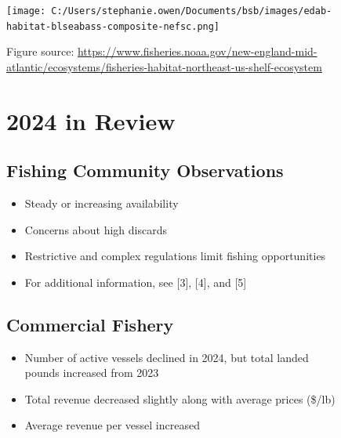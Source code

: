 \documentclass[
  10pt,
  letterpaper,
  DIV=11,
  numbers=noendperiod]{scrartcl}
\providecommand{\tightlist}{%
  \setlength{\itemsep}{0pt}\setlength{\parskip}{0pt}}\usepackage{longtable,booktabs,array}
\begin{document}
\begin{figure}

\begin{minipage}{0.40\linewidth}

\texttt{[image: C:/Users/stephanie.owen/Documents/bsb/images/edab-habitat-blseabass-composite-nefsc.png]}
\footnotesize

\raggedright

Figure source:
\url{https://www.fisheries.noaa.gov/new-england-mid-atlantic/ecosystems/fisheries-habitat-northeast-us-shelf-ecosystem}
\normalsize\end{minipage}%
%
\begin{minipage}{0.03\linewidth}

\hfill

\end{minipage}%
%
\begin{minipage}{0.57\linewidth}

\section{2024 in Review}
\vspace{-0.25cm}

\subsection{Fishing Community Observations}

\begin{itemize}
\tightlist
\item
  Steady or increasing availability
\item
  Concerns about high discards
\item
  Restrictive and complex regulations limit fishing opportunities
\item
  For additional information, see {[}3{]}, {[}4{]}, and {[}5{]}
\end{itemize}

\vspace{-0.25cm}
\subsection{Commercial Fishery}

\begin{itemize}
\tightlist
\item
  Number of active vessels declined in 2024, but total landed pounds
  increased from 2023
\item
  Total revenue decreased slightly along with average prices (\$/lb)
\item
  Average revenue per vessel increased
\end{itemize}


\end{minipage}
\end{figure}
\end{document}
